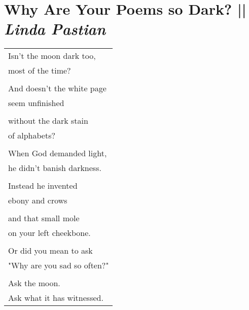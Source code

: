 \section[Why Are Your Poems so Dark? ]{Why Are Your Poems so Dark? || \emph{Linda Pastian} \hspace*{\fill}  \thepage}
\hspace{0pt}
\vfill
\begin{center}
\begin{tabular}{l}
Isn't the moon dark too,\\
most of the time?\\
\\
And doesn't the white page\\
seem unfinished\\
\\
without the dark stain\\
of alphabets?\\
\\
When God demanded light,\\
he didn't banish darkness.\\
\\
Instead he invented\\
ebony and crows\\
\\
and that small mole\\
on your left cheekbone.\\
\\
Or did you mean to ask\\
"Why are you sad so often?"\\
\\
Ask the moon.\\
Ask what it has witnessed.
\end{tabular}
\end{center}
\vfill
\hspace{0pt}